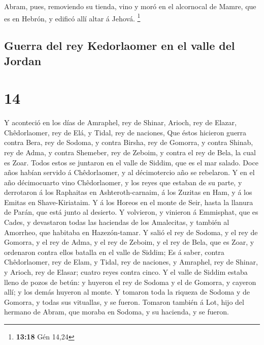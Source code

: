  Abram, pues, removiendo su tienda, vino y moró en el
alcornocal de Mamre, que es en Hebrón, y edificó allí altar á Jehová.
\footnote{\textbf{13:18} Gén 14,24}

\hypertarget{guerra-del-rey-kedorlaomer-en-el-valle-del-jordan}{%
\subsection{Guerra del rey Kedorlaomer en el valle del
Jordan}\label{guerra-del-rey-kedorlaomer-en-el-valle-del-jordan}}

\hypertarget{section-13}{%
\section{14}\label{section-13}}

 Y aconteció en los días de Amraphel, rey de Shinar,
Arioch, rey de Elazar, Chêdorlaomer, rey de Elá, y Tidal, rey de
naciones,  Que éstos hicieron guerra contra Bera, rey de
Sodoma, y contra Birsha, rey de Gomorra, y contra Shinab, rey de Adma, y
contra Shemeber, rey de Zeboim, y contra el rey de Bela, la cual es
Zoar.  Todos estos se juntaron en el valle de Siddim, que
es el mar salado.  Doce años habían servido á
Chêdorlaomer, y al décimotercio año se rebelaron.  Y en el
año décimocuarto vino Chêdorlaomer, y los reyes que estaban de su parte,
y derrotaron á los Raphaitas en Ashteroth-carnaim, á los Zuzitas en Ham,
y á los Emitas en Shave-Kiriataim.  Y á los Horeos en el
monte de Seir, hasta la llanura de Parán, que está junto al desierto.
 Y volvieron, y vinieron á Emmisphat, que es Cades, y
devastaron todas las haciendas de los Amalecitas, y también al Amorrheo,
que habitaba en Hazezón-tamar.  Y salió el rey de Sodoma,
y el rey de Gomorra, y el rey de Adma, y el rey de Zeboim, y el rey de
Bela, que es Zoar, y ordenaron contra ellos batalla en el valle de
Siddim;  Es á saber, contra Chêdorlaomer, rey de Elam, y
Tidal, rey de naciones, y Amraphel, rey de Shinar, y Arioch, rey de
Elasar; cuatro reyes contra cinco.  Y el valle de Siddim
estaba lleno de pozos de betún: y huyeron el rey de Sodoma y el de
Gomorra, y cayeron allí; y los demás huyeron al monte.  Y
tomaron toda la riqueza de Sodoma y de Gomorra, y todas sus vituallas, y
se fueron.  Tomaron también á Lot, hijo del hermano de
Abram, que moraba en Sodoma, y su hacienda, y se fueron.

